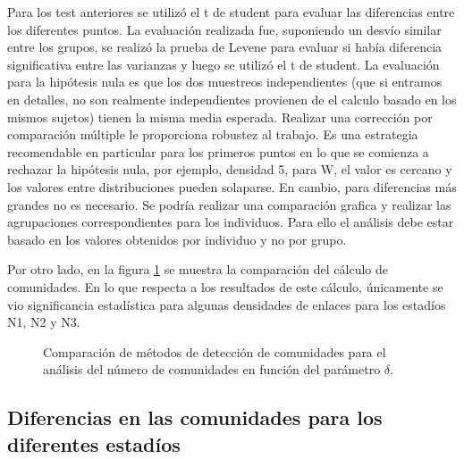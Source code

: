 \documentclass{article}
\begin{document}
Para los test anteriores se utilizó el t de student para evaluar las diferencias entre los diferentes puntos. La evaluación realizada fue, suponiendo un desvío similar entre los grupos, se realizó la prueba de Levene para evaluar si había diferencia significativa entre las varianzas y luego se utilizó el t de student. La evaluación para la hipótesis nula es que los dos muestreos independientes (que si entramos en detalles, no son realmente independientes provienen de el calculo basado en los mismos sujetos) tienen la misma media esperada. Realizar una corrección por comparación múltiple le proporciona robustez al trabajo. Es una estrategia recomendable en particular para los primeros puntos en lo que se comienza a rechazar la hipótesis nula, por ejemplo, densidad 5, para W, el valor es cercano y los valores entre distribuciones pueden solaparse. En cambio, para diferencias más grandes no es necesario. Se podría realizar una comparación grafica y realizar las agrupaciones correspondientes para los individuos. Para ello el análisis debe estar basado en los valores obtenidos por individuo y no por grupo.

Por otro lado, en la figura \ref{fig:detect_comun} se muestra la comparación del cálculo de comunidades. En lo que respecta a los resultados de este cálculo, únicamente se vio significancia estadística para algunas densidades de enlaces para los estadíos N1, N2 y N3.

\begin{figure}[H]
    \centering
    \hfill
    \hfill
    \hfill
    \hfill
    \caption[]{Comparación de métodos de detección de comunidades para el análisis del número de comunidades en función del parámetro $\delta$. \footnotemark}
    \label{fig:detect_comun}
\end{figure}

\subsection{Diferencias en las comunidades para los diferentes estadíos}
\end{document}
